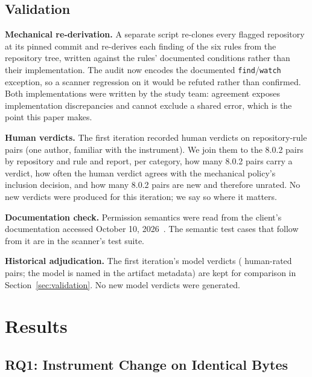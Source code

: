 \documentclass[10pt,conference]{IEEEtran}
\newcommand{\vold}{7.15.0}
\newcommand{\vnew}{8.0.2}
\begin{document}
\subsection{Validation}

\textbf{Mechanical re-derivation.} A separate script re-clones every flagged repository at its pinned commit and re-derives each finding of the six rules from the repository tree, written against the rules' documented conditions rather than their implementation. The audit now encodes the documented \texttt{find}/\texttt{watch} exception, so a scanner regression on it would be refuted rather than confirmed. Both implementations were written by the study team: agreement exposes implementation discrepancies and cannot exclude a shared error, which is the point this paper makes.

\textbf{Human verdicts.} The first iteration recorded \HumanTotalVerdicts{} human verdicts on repository-rule pairs (one author, familiar with the instrument). We join them to the \vnew{} pairs by repository and rule and report, per category, how many \vnew{} pairs carry a verdict, how often the human verdict agrees with the mechanical policy's inclusion decision, and how many \vnew{} pairs are new and therefore unrated. No new verdicts were produced for this iteration; we say so where it matters.

\textbf{Documentation check.} Permission semantics were read from the client's documentation accessed October 10, 2026~\cite{claude_permissions}. The semantic test cases that follow from it are in the scanner's test suite.

\textbf{Historical adjudication.} The first iteration's model verdicts (\HumanTotalVerdicts{} human-rated pairs; the model is named in the artifact metadata) are kept for comparison in Section~\ref{sec:validation}. No new model verdicts were generated.

\section{Results}

\subsection{RQ1: Instrument Change on Identical Bytes}
\label{sec:instrument}

\begin{table}[t]
\centering
\caption{Instrument change. Repositories in each category under \vold{} and \vnew{} on the same pinned commits (\NPinnedOk{} rescanned repositories, mechanical policy applied to both). \emph{Lost} and \emph{gained} are repository-level differences.}
\label{tab:instrument}
\small

\end{table}
\end{document}
